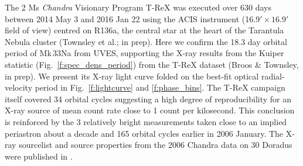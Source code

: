 \documentclass[fleqn,usenatbib]{mnras}
\begin{document}



The 2 Ms {\it Chandra} Visionary Program T-ReX was executed over 630 days between 2014 May 3 and 2016 Jan 22 using the ACIS instrument (16.9$' \times 16.9'$ field of view) centred on R136a, the central star at the heart of the Tarantula Nebula cluster (Townsley et al.; in prep). Here we confirm the 18.3 day orbital period of Mk\,33Na from UVES, supporting the X-ray results from the Kuiper statistic (Fig.~\ref{f:spec_dens_period}) from the T-ReX dataset (Broos \& Townsley, in prep). We present its X-ray light curve folded on the best-fit optical radial-velocity period in Fig.~\ref{f:lightcurve} and \ref{f:phase_bins}. The T-ReX campaign itself covered 34 orbital cycles suggesting a high degree of reproducibility for an X-ray source of mean count rate close to 1 count per kilosecond. This conclusion is reinforced by the 3 relatively bright measurements taken close to an implied periastron about a decade and 165 orbital cycles earlier in 2006 January. The X-ray sourcelist and source properties from the 2006 Chandra data on 30 Doradus were published in \cite{townsley2014}.

\end{document}
